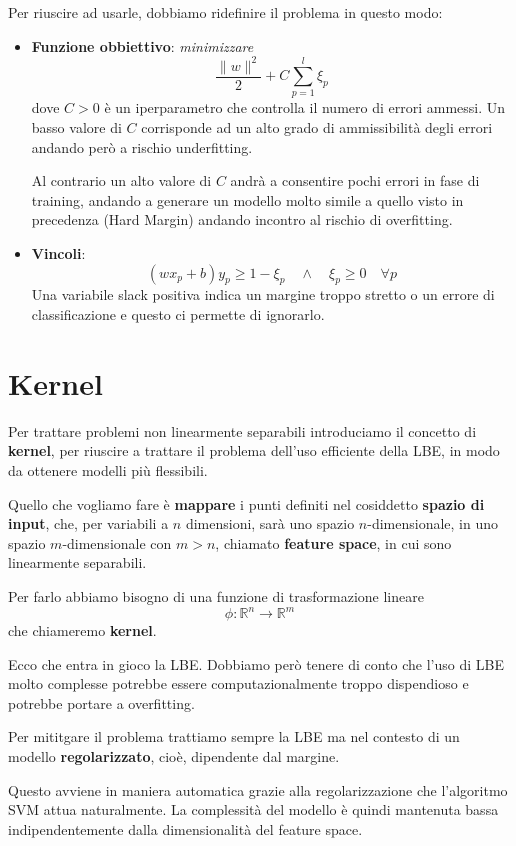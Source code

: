 Per riuscire ad usarle, dobbiamo ridefinire il problema in questo modo:
\begin{itemize}
	\item \textbf{Funzione obbiettivo}: \emph{minimizzare}
	      \[ \frac{\| w \|^2}{2} + C \sum_{p=1}^l \xi_p \]
	      dove $C > 0$ \`e un iperparametro che controlla il numero di errori ammessi. Un basso valore di $C$ corrisponde
	      ad un alto grado di ammissibilit\`a degli errori andando per\`o a rischio underfitting.

	      Al contrario un alto valore di $C$ andr\`a a consentire pochi errori in fase di training, andando a generare un
	      modello molto simile a quello visto in precedenza (Hard Margin) andando incontro al rischio di overfitting.
	\item \textbf{Vincoli}:
	      \[ (w x_p + b) y_p \geq 1 - \xi_p \quad \wedge \quad \xi_p \geq 0 \quad \forall p \]
	      Una variabile slack positiva indica un margine troppo stretto o un errore di classificazione e questo ci permette
	      di ignorarlo.
\end{itemize}

\section{Kernel}
Per trattare problemi non linearmente separabili introduciamo il concetto di \textbf{kernel}, per riuscire a trattare il
problema dell'uso efficiente della LBE, in modo da ottenere modelli pi\`u flessibili.

Quello che vogliamo fare \`e \textbf{mappare} i punti definiti nel cosiddetto \textbf{spazio di input}, che, per variabili a
$n$ dimensioni, sar\`a uno spazio $n$-dimensionale, in uno spazio $m$-dimensionale con $m > n$, chiamato
\textbf{feature space}, in cui sono linearmente separabili.

Per farlo abbiamo bisogno di una funzione di trasformazione lineare
\[ \phi : \mathbb{R}^n \rightarrow \mathbb{R}^m \]
che chiameremo \textbf{kernel}.

Ecco che entra in gioco la LBE. Dobbiamo per\`o tenere di conto che l'uso di LBE molto complesse potrebbe essere
computazionalmente troppo dispendioso e potrebbe portare a overfitting.

Per mititgare il problema trattiamo sempre la LBE ma nel contesto di un modello \textbf{regolarizzato}, cio\`e, dipendente
dal margine.

Questo avviene in maniera automatica grazie alla regolarizzazione che l'algoritmo SVM attua naturalmente. La complessit\`a
del modello \`e quindi mantenuta bassa indipendentemente dalla dimensionalit\`a del feature space.

